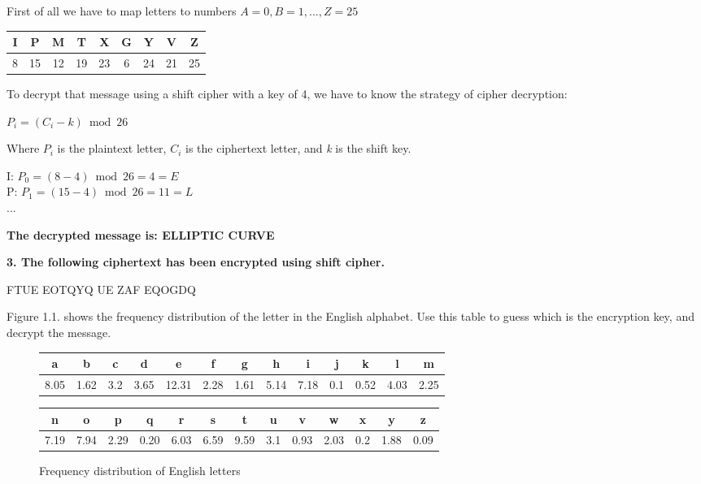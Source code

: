 \documentclass[]{article}
\numberwithin{figure}{section}
\begin{document}
\noindent 
First of all we have to map letters to numbers $A = 0, B = 1,..., Z=25$ 
\medskip
\begin{center}
	\begin{tabular}{|c|c|c|c|c|c|c|c|c|}
		\hline
		I & P & M & T & X & G & Y & V & Z \\
		\hline
		8 & 15 & 12 & 19 & 23 & 6 & 24 & 21 & 25 \\
		\hline
	\end{tabular}
\end{center}
To decrypt that message using a shift cipher with a key of 4, we have to know the strategy of cipher decryption:
\begin{center}
	$P_i = (C_i - k) \bmod 26$
\end{center}
Where $P_i$ is the plaintext letter, $C_i$ is the ciphertext letter, and \textit{k} is the shift key.
\medskip
\begin{center}
I: $P_0 = (8 - 4) \bmod 26 = 4 = E$ \\
P: $P_1 = (15 - 4) \bmod 26 = 11 = L$ \\
...

\textbf{The decrypted message is: ELLIPTIC CURVE}
\end{center}
\newpage
\noindent
\textbf{3. The following ciphertext has been encrypted using shift cipher.}
\begin{center}
	FTUE EOTQYQ UE ZAF EQOGDQ
\end{center}
\indent
Figure 1.1. shows the frequency distribution of the letter in the English alphabet. Use this table to guess which is the encryption key, and decrypt the message.
\begin{figure}[h]
	\centering
	\begin{tabular}{|c|c|c|c|c|c|c|c|c|c|c|c|c|}
		\hline
		a & b & c & d & e & f & g & h & i & j & k & l & m \\
		\hline
		8.05 & 1.62 & 3.2 & 3.65 & 12.31 & 2.28 & 1.61 & 5.14 & 7.18 & 0.1 & 0.52 & 4.03 & 2.25 \\
		\hline
	\end{tabular}
	\begin{tabular}{|c|c|c|c|c|c|c|c|c|c|c|c|c|}
		\hline
		n & o & p & q & r & s & t & u & v & w & x & y & z \\
		\hline
		7.19 & 7.94 & 2.29 & 0.20 & 6.03 & 6.59 & 9.59 & 3.1 & 0.93 & 2.03 & 0.2 & 1.88 & 0.09 \\
		\hline
	\end{tabular}
	\caption{Frequency distribution of English letters}
	\label{fig:mi_figura}
\end{figure}
\end{document}
